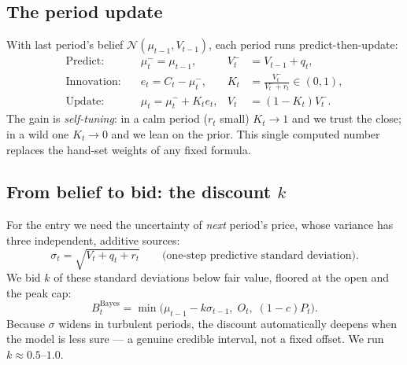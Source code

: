 \documentclass[11pt]{article}
\begin{document}
\subsection{The period update}
With last period's belief $\mathcal N(\mu_{t-1},V_{t-1})$, each period runs predict-then-update:
\begin{align}
\text{Predict:}\quad & \mu_t^-=\mu_{t-1}, & V_t^-&=V_{t-1}+q_t,\\
\text{Innovation:}\quad & e_t=C_t-\mu_t^-, & K_t&=\frac{V_t^-}{V_t^-+r_t}\in(0,1),\\
\text{Update:}\quad & \mu_t=\mu_t^-+K_te_t, & V_t&=(1-K_t)V_t^-.
\end{align}
The gain is \emph{self-tuning}: in a calm period ($r_t$ small) $K_t\to1$ and we trust the close;
in a wild one $K_t\to0$ and we lean on the prior. This single computed number replaces the
hand-set weights of any fixed formula.

\subsection{From belief to bid: the discount $k$}
For the entry we need the uncertainty of \emph{next} period's price, whose variance has three
independent, additive sources:
\begin{equation}\label{eq:bayessig}
\sigma_t=\sqrt{V_t+q_t+r_t}\qquad\text{(one-step predictive standard deviation)}.
\end{equation}
We bid $k$ of these standard deviations below fair value, floored at the open and the peak cap:
\begin{equation}
B_t^{\text{Bayes}}=\min\bigl(\mu_{t-1}-k\sigma_{t-1},\;O_t,\;(1-c)P_t\bigr).
\end{equation}
Because $\sigma$ widens in turbulent periods, the discount automatically deepens when the model
is less sure --- a genuine credible interval, not a fixed offset. We run $k\approx0.5$--$1.0$.
\end{document}
